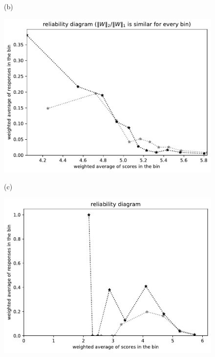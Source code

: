 \documentclass{article}
\newlength{\vertsep}
\newlength{\imsize}
\begin{document}
\begin{figure}
\begin{centering}
(b)
\parbox{\imsize}{\includegraphics[width=\imsize]
{../codes/weighted/County_of_San_Francisco_vs_San_Mateo-LNGI/equierrs10.pdf}}
\quad\quad
(c)
\parbox{\imsize}{\includegraphics[width=\imsize]
{../codes/weighted/County_of_San_Francisco_vs_San_Mateo-LNGI/equiscores10.pdf}}

\vspace{\vertsep}


\end{centering}
\end{figure}
\end{document}
